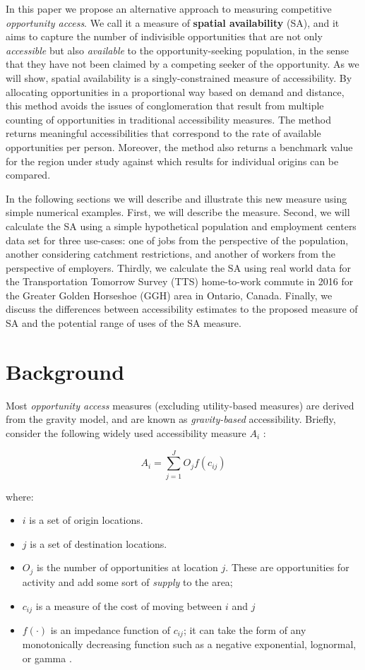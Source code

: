 \documentclass[]{elsarticle} %
\providecommand{\tightlist}{%
  \setlength{\itemsep}{0pt}\setlength{\parskip}{0pt}}
\begin{document}
In this paper we propose an alternative approach to measuring
competitive \emph{opportunity access}. We call it a measure of
\textbf{spatial availability} (SA), and it aims to capture the number of
indivisible opportunities that are not only \emph{accessible} but also
\emph{available} to the opportunity-seeking population, in the sense
that they have not been claimed by a competing seeker of the
opportunity. As we will show, spatial availability is a
singly-constrained measure of accessibility. By allocating opportunities
in a proportional way based on demand and distance, this method avoids
the issues of conglomeration that result from multiple counting of
opportunities in traditional accessibility measures. The method returns
meaningful accessibilities that correspond to the rate of available
opportunities per person. Moreover, the method also returns a benchmark
value for the region under study against which results for individual
origins can be compared.

In the following sections we will describe and illustrate this new
measure using simple numerical examples. First, we will describe the
measure. Second, we will calculate the SA using a simple hypothetical
population and employment centers data set for three use-cases: one of
jobs from the perspective of the population, another considering
catchment restrictions, and another of workers from the perspective of
employers. Thirdly, we calculate the SA using real world data for the
Transportation Tomorrow Survey (TTS) home-to-work commute in 2016 for
the Greater Golden Horseshoe (GGH) area in Ontario, Canada. Finally, we
discuss the differences between accessibility estimates to the proposed
measure of SA and the potential range of uses of the SA measure.

\hypertarget{background}{%
\section{Background}\label{background}}

Most \emph{opportunity access} measures (excluding utility-based
measures) are derived from the gravity model, and are known as
\emph{gravity-based} accessibility. Briefly, consider the following
widely used accessibility measure \(A_i\) :

\[
A_i = \sum_{j=1}^JO_jf(c_{ij})
\]

\noindent where:

\begin{itemize}
\tightlist
\item
  \(i\) is a set of origin locations.
\item
  \(j\) is a set of destination locations.
\item
  \(O_j\) is the number of opportunities at location \(j\). These are
  opportunities for activity and add some sort of \emph{supply} to the
  area;
\item
  \(c_{ij}\) is a measure of the cost of moving between \(i\) and \(j\)
\item
  \(f(\cdot)\) is an impedance function of \(c_{ij}\); it can take the
  form of any monotonically decreasing function such as a negative
  exponential, lognormal, or gamma .
\end{itemize}
\end{document}
